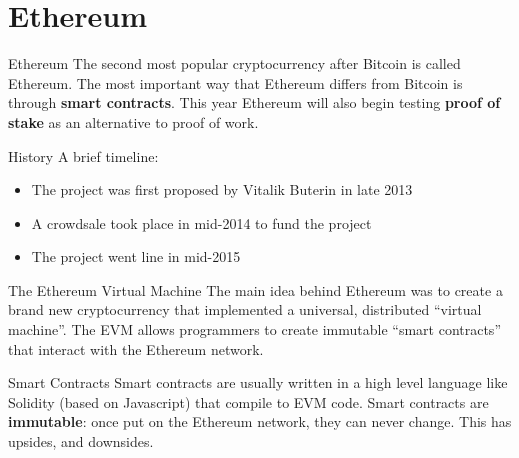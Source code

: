 \documentclass[14pt]{beamer}
\begin{document}
\section{Ethereum}

\begin{frame}{Ethereum}
  The second most popular cryptocurrency after Bitcoin is called Ethereum.
  \newline
  \newline
  The most important way that Ethereum differs from Bitcoin is through
  \textbf{smart contracts}.
  \newline
  \newline
  This year Ethereum will also begin testing \textbf{proof of stake} as an
  alternative to proof of work.
\end{frame}

\begin{frame}{History}
  A brief timeline:
  \newline
  \begin{itemize}
  \item The project was first proposed by Vitalik Buterin in late 2013
  \item A crowdsale took place in mid-2014 to fund the project
  \item The project went line in mid-2015
  \end{itemize}
\end{frame}

\begin{frame}{The Ethereum Virtual Machine}
  The main idea behind Ethereum was to create a brand new cryptocurrency that
  implemented a universal, distributed ``virtual machine''.
  \newline
  \newline
  The EVM allows programmers to create immutable ``smart contracts'' that
  interact with the Ethereum network.
\end{frame}

\begin{frame}{Smart Contracts}
  Smart contracts are usually written in a high level language like Solidity
  (based on Javascript) that compile to EVM code.
  \newline
  \newline
  Smart contracts are \textbf{immutable}: once put on the Ethereum network, they
  can never change. This has upsides, and downsides.
\end{frame}
\end{document}
